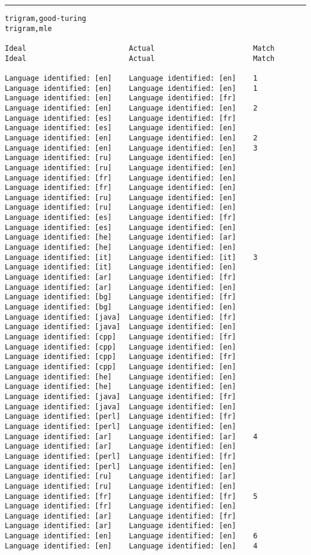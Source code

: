 \tiny
\hrule\vskip4pt
\begin{verbatim}
trigram,good-turing                                               trigram,mle

Ideal                        Actual                       Match   Ideal                        Actual                       Match

Language identified: [en]    Language identified: [en]    1       Language identified: [en]    Language identified: [en]    1
Language identified: [en]    Language identified: [fr]            Language identified: [en]    Language identified: [en]    2
Language identified: [es]    Language identified: [fr]            Language identified: [es]    Language identified: [en]
Language identified: [en]    Language identified: [en]    2       Language identified: [en]    Language identified: [en]    3
Language identified: [ru]    Language identified: [en]            Language identified: [ru]    Language identified: [en]
Language identified: [fr]    Language identified: [en]            Language identified: [fr]    Language identified: [en]
Language identified: [ru]    Language identified: [en]            Language identified: [ru]    Language identified: [en]
Language identified: [es]    Language identified: [fr]            Language identified: [es]    Language identified: [en]
Language identified: [he]    Language identified: [ar]            Language identified: [he]    Language identified: [en]
Language identified: [it]    Language identified: [it]    3       Language identified: [it]    Language identified: [en]
Language identified: [ar]    Language identified: [fr]            Language identified: [ar]    Language identified: [en]
Language identified: [bg]    Language identified: [fr]            Language identified: [bg]    Language identified: [en]
Language identified: [java]  Language identified: [fr]            Language identified: [java]  Language identified: [en]
Language identified: [cpp]   Language identified: [fr]            Language identified: [cpp]   Language identified: [en]
Language identified: [cpp]   Language identified: [fr]            Language identified: [cpp]   Language identified: [en]
Language identified: [he]    Language identified: [en]            Language identified: [he]    Language identified: [en]
Language identified: [java]  Language identified: [fr]            Language identified: [java]  Language identified: [en]
Language identified: [perl]  Language identified: [fr]            Language identified: [perl]  Language identified: [en]
Language identified: [ar]    Language identified: [ar]    4       Language identified: [ar]    Language identified: [en]
Language identified: [perl]  Language identified: [fr]            Language identified: [perl]  Language identified: [en]
Language identified: [ru]    Language identified: [ar]            Language identified: [ru]    Language identified: [en]
Language identified: [fr]    Language identified: [fr]    5       Language identified: [fr]    Language identified: [en]
Language identified: [ar]    Language identified: [fr]            Language identified: [ar]    Language identified: [en]
Language identified: [en]    Language identified: [en]    6       Language identified: [en]    Language identified: [en]    4


\end{verbatim}
